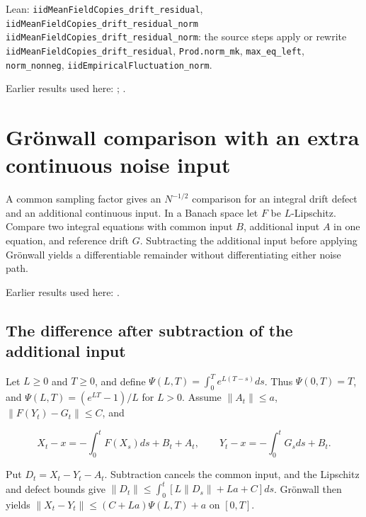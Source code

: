 \documentclass[11pt,a4paper]{report}
\begin{document}
\begin{leanbox}{Lean: \texttt{iidMeanFieldCopies\_\allowbreak{}drift\_\allowbreak{}residual}, \texttt{iidMeanFieldCopies\_\allowbreak{}drift\_\allowbreak{}residual\_\allowbreak{}norm}}
\texttt{iid\allowbreak{}Mean\allowbreak{}Field\allowbreak{}Copies\_\allowbreak{}drift\_\allowbreak{}residual\_\allowbreak{}norm}: the source steps apply or rewrite \texttt{iid\allowbreak{}Mean\allowbreak{}Field\allowbreak{}Copies\_\allowbreak{}drift\_\allowbreak{}residual}, \texttt{Prod.\allowbreak{}norm\_\allowbreak{}mk}, \texttt{max\_\allowbreak{}eq\_\allowbreak{}left}, \texttt{norm\_\allowbreak{}nonneg}, \texttt{iid\allowbreak{}Empirical\allowbreak{}Fluctuation\_\allowbreak{}norm}.
\end{leanbox}


Earlier results used here: \cite[Section~3.13.2]{LangevinLean2026ULASC}; \cite[Section~3.1.1]{LangevinLean2026IPLA}.
\section{\texorpdfstring{Grönwall comparison with an extra continuous noise input}{Grönwall comparison with an extra continuous noise input}}
\label{proof-module-ProximalLangevin-MeanFieldForcing-lean}


A common sampling factor gives an \(N^{-1/2}\) comparison for an integral drift defect and an additional continuous input. In a Banach space let \(F\) be \(L\)-Lipschitz. Compare two integral equations with common input \(B\), additional input \(A\) in one equation, and reference drift \(G\). Subtracting the additional input before applying Grönwall yields a differentiable remainder without differentiating either noise path.



Earlier results used here: \cite[Section~3.43]{LangevinLean2026ULASC}.
\subsection{\texorpdfstring{The difference after subtraction of the additional input}{The difference after subtraction of the additional input}}
\label{report-step-ProximalLangevin-MeanFieldForcing-lean-1}


Let \(L\ge0\) and \(T\ge0\), and define \(\Psi(L,T)=\int_0^T e^{L(T-s)}ds\). Thus \(\Psi(0,T)=T\), and \(\Psi(L,T)=(e^{LT}-1)/L\) for \(L>0\). Assume \(\|A_t\|\le a\), \(\|F(Y_t)-G_t\|\le C\), and

\[X_t-x=-\int_0^tF(X_s)ds+B_t+A_t,\qquad Y_t-x=-\int_0^tG_sds+B_t.\]

Put \(D_t=X_t-Y_t-A_t\). Subtraction cancels the common input, and the Lipschitz and defect bounds give \(\|D_t\|\le\int_0^t[L\|D_s\|+La+C]ds\). Grönwall then yields \(\|X_t-Y_t\|\le(C+La)\Psi(L,T)+a\) on \([0,T]\).
\end{document}
